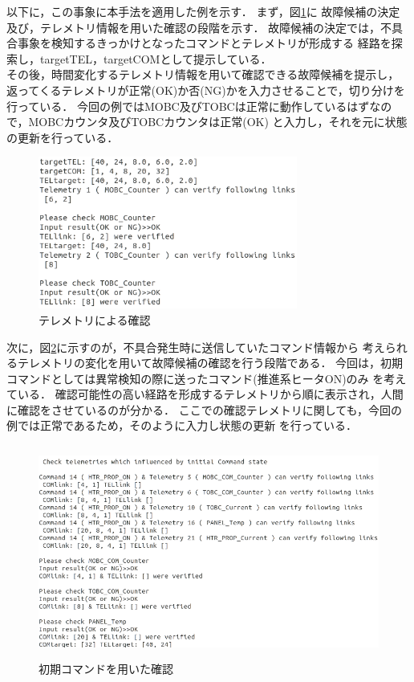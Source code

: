 \documentclass[11pt]{jsreport}
\begin{document}
以下に，この事象に本手法を適用した例を示す．
まず，図\ref{fig:tel_phase}に
故障候補の決定及び，テレメトリ情報を用いた確認の段階を示す．
故障候補の決定では，不具合事象を検知するきっかけとなったコマンドとテレメトリが形成する
経路を探索し，targetTEL，targetCOMとして提示している．\\
その後，時間変化するテレメトリ情報を用いて確認できる故障候補を提示し，
返ってくるテレメトリが正常(OK)か否(NG)かを入力させることで，切り分けを行っている．
今回の例ではMOBC及びTOBCは正常に動作しているはずなので，MOBCカウンタ及びTOBCカウンタは正常(OK)
と入力し，それを元に状態の更新を行っている．
\begin{figure}[H]
   \centering
      \includegraphics[height=5.0cm]{figure/COM14_TEL17_TEL_phase.png}
      \caption{テレメトリによる確認}
      \label{fig:tel_phase}
\end{figure}
次に，図\ref{fig:ini_COM_phase}に示すのが，不具合発生時に送信していたコマンド情報から
考えられるテレメトリの変化を用いて故障候補の確認を行う段階である．
今回は，初期コマンドとしては異常検知の際に送ったコマンド(推進系ヒータON)のみ
を考えている．
確認可能性の高い経路を形成するテレメトリから順に表示され，人間に確認をさせているのが分かる．
ここでの確認テレメトリに関しても，今回の例では正常であるため，そのように入力し状態の更新
を行っている．
\begin{figure}[H]
   \centering
      \includegraphics[height=7.0cm]{figure/COM14_TEL17_iniCOM_phase.png}
      \caption{初期コマンドを用いた確認}
      \label{fig:ini_COM_phase}
\end{figure}
\end{document}
